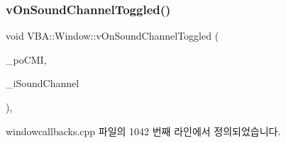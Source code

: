 \subsubsection{\texorpdfstring{v\+On\+Sound\+Channel\+Toggled()}{vOnSoundChannelToggled()}}
{\footnotesize\ttfamily void V\+B\+A\+::\+Window\+::v\+On\+Sound\+Channel\+Toggled (\begin{DoxyParamCaption}\item[{Gtk\+::\+Check\+Menu\+Item $\ast$}]{\+\_\+po\+C\+MI,  }\item[{\mbox{\hyperlink{_util_8cpp_a0ef32aa8672df19503a49fab2d0c8071}{int}}}]{\+\_\+i\+Sound\+Channel }\end{DoxyParamCaption})\hspace{0.3cm}{\ttfamily [protected]}, {\ttfamily [virtual]}}



windowcallbacks.\+cpp 파일의 1042 번째 라인에서 정의되었습니다.


